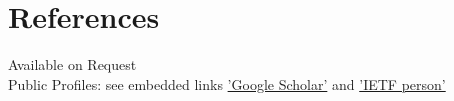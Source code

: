 \documentclass[11pt,a4paper,sans]{moderncv} %
\begin{document}
\vspace{5mm}
\begin{comment}
\begin{center}
\begin{tikzpicture}
\begin{scope}[curve in scope]
	\path (0,0) -- node[auto] { End CV. (Published work listed below)} (10,0);
\end{scope}
 \end{tikzpicture}
 \end{center}

\section{Publications}

\subsection{Published Papers (Accepted)}
\newbibliography{journal}
\nocite{journal}{*}
{plainyrrev}
{journal}
{\large \textsc{Refereed Journal Articles}}

\subsection{Standards and Industry Relevant Publications}
\newbibliography{conference}
\nocite{conference}{*}
{plainyrrev}
{conference}
{\large \textsc{Standards and Industry Relevant Publications}}

\subsection{Publications and Speeches as Subject Matter Expert}
\newbibliography{speeches}
\nocite{speeches}{*}
{plainyrrev}
{speeches}
{\large \textsc{Publications and Speeches as Subject Matter Expert}}

\end{comment}
\section{References}
Available on Request
\\
Public Profiles: see embedded links \textcolor[RGB]{110, 150, 240}{\href{https://scholar.google.com/citations?hl=en&user=whVRYl4AAAAJ}{ 'Google Scholar'} 
 and \href{https://datatracker.ietf.org/person/kiran.ietf@gmail.com}{'IETF person'}}
\end{document}
